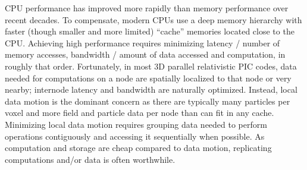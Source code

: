\documentclass[10pt]{article}
\begin{document}
%

CPU performance has improved more rapidly than memory performance over
recent decades.  To compensate, modern CPUs use a deep memory
hierarchy with faster (though smaller and more limited) ``cache''
memories located close to the CPU.  Achieving high performance
requires minimizing latency / number of memory accesses, bandwidth /
amount of data accessed and computation, in roughly that order.
Fortunately, in most 3D parallel relativistic PIC codes, data needed
for computations on a node are spatially localized to that node or
very nearby; internode latency and bandwidth are naturally optimized.
Instead, local data motion is the dominant concern as there are
typically many particles per voxel and more field and particle data
per node than can fit in any cache.  Minimizing local data motion
requires grouping data needed to perform operations contiguously and
accessing it sequentially when possible.  As computation and storage
are cheap compared to data motion, replicating computations and/or
data is often worthwhile.
\end{document}
